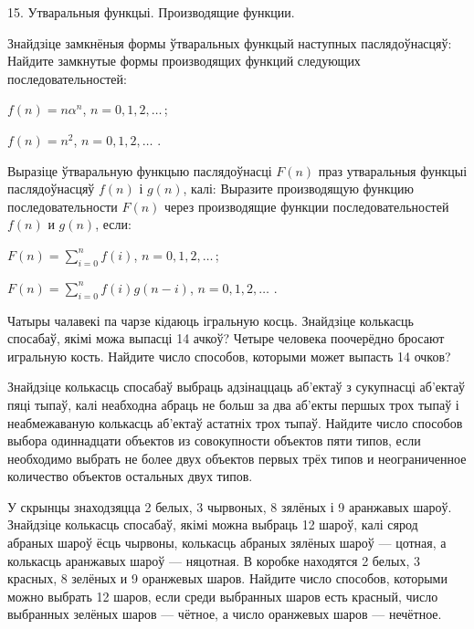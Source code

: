 



\biLangHeader
{15. Утваральныя функцыі.}
{Производящие функции.}

\begin{problemList}

\problemItemWithCommonPart
{Знайдзіце замкнёныя формы ўтваральных функцый наступных паслядоўнасцяў:}
{Найдите замкнутые формы производящих функций следующих последовательностей:}
{\begin{belarusianEnumerate}
  \item $f(n) = n\alpha^n$, $n = 0, 1, 2, \ldots\, $;
  \item $f(n) = n^2$, $n = 0, 1, 2, \ldots\,\, $.
\end{belarusianEnumerate}}

\bigskip

\problemItemWithCommonPart
{Выразіце ўтваральную функцыю паслядоўнасці $F(n)$ праз утваральныя функцыі
паслядоўнасцяў $f(n)$ і $g(n)$, калі:}
{Выразите производящую функцию последовательности $F(n)$ через производящие
функции последовательностей $f(n)$ и $g(n)$, если:}
{\begin{belarusianEnumerate}
  \item $F(n) = \sum \limits _{i = 0}^n f(i)$, $n = 0, 1, 2, \ldots\, $;
  \item $F(n) = \sum \limits _{i = 0}^n f(i)g(n - i)$, $n = 0, 1, 2, \ldots\,\, $.
\end{belarusianEnumerate}}

\bigskip

\problemItemSimple
{Чатыры чалавекі па чарзе кідаюць ігральную косць. Знайдзіце колькасць спосабаў,
якімі можа выпасці 14 ачкоў?}
{Четыре человека поочерёдно бросают игральную кость. Найдите число способов,
которыми может выпасть 14 очков?}

\bigskip

\problemItemSimple
{Знайдзіце колькасць спосабаў выбраць адзінаццаць аб'ектаў з сукупнасці аб'ектаў
пяці тыпаў, калі неабходна абраць не больш за два аб'екты першых трох тыпаў і неабмежаваную
колькасць аб'ектаў астатніх трох тыпаў.}
{Найдите число способов выбора одиннадцати объектов из совокупности объектов
пяти типов, если необходимо выбрать не более двух объектов первых трёх типов и
неограниченное количество объектов остальных двух типов.}

\bigskip

\problemItemSimple
{У скрынцы знаходзяцца 2 белых, 3 чырвоных, 8 зялёных і 9 аранжавых шароў.
Знайдзіце колькасць спосабаў, якімі можна выбраць 12 шароў, калі сярод абраных шароў
ёсць чырвоны, колькасць абраных зялёных шароў --- цотная, а колькасць аранжавых шароў --- няцотная.}
{В коробке находятся 2 белых, 3 красных, 8 зелёных и 9 оранжевых шаров.
Найдите число способов, которыми можно выбрать 12 шаров, если среди выбранных шаров
есть красный, число выбранных зелёных шаров --- чётное, а число оранжевых шаров --- нечётное.}


\end{problemList}
